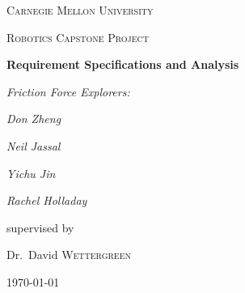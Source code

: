 \documentclass{spec}
\begin{document}
\begin{titlepage}
	\centering
	{\scshape\LARGE Carnegie Mellon University \par}
	\vspace{1cm}
	{\scshape\Large Robotics Capstone Project\par}
	\vspace{1.5cm}
	{\huge\bfseries Requirement Specifications and Analysis\par}
	\vspace{2cm}
	{\Large\itshape Friction Force Explorers:\par}
	\vspace{1cm}
	{\Large\itshape Don Zheng\par}
	{\Large\itshape Neil Jassal\par}
	{\Large\itshape Yichu Jin\par}
	{\Large\itshape Rachel Holladay\par}
	\vfill
	supervised by\par
	Dr.~David \textsc{Wettergreen}

	\vfill

	{\large \today\par}
\end{titlepage}

\tableofcontents
\listoffigures
\newpage






\end{document}
